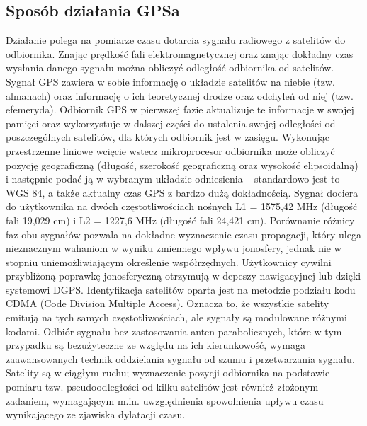 \documentclass{article}
\begin{document}
\subsection{Sposób działania GPSa}
Działanie polega na pomiarze czasu dotarcia sygnału radiowego z satelitów do odbiornika. Znając prędkość fali elektromagnetycznej oraz znając dokładny czas wysłania danego sygnału można obliczyć odległość odbiornika od satelitów. Sygnał GPS zawiera w sobie informację o układzie satelitów na niebie (tzw. almanach) oraz informację o ich teoretycznej drodze oraz odchyleń od niej (tzw. efemeryda). Odbiornik GPS w pierwszej fazie aktualizuje te informacje w swojej pamięci oraz wykorzystuje w dalszej części do ustalenia swojej odległości od poszczególnych satelitów, dla których odbiornik jest w zasięgu. Wykonując przestrzenne liniowe wcięcie wstecz mikroprocesor odbiornika może obliczyć pozycję geograficzną (długość, szerokość geograficzną oraz wysokość elipsoidalną) i następnie podać ją w wybranym układzie odniesienia – standardowo jest to WGS 84, a także aktualny czas GPS z bardzo dużą dokładnością.
Sygnał dociera do użytkownika na dwóch częstotliwościach nośnych L1 = 1575,42 MHz (długość fali 19,029 cm) i L2 = 1227,6 MHz (długość fali 24,421 cm). Porównanie różnicy faz obu sygnałów pozwala na dokładne wyznaczenie czasu propagacji, który ulega nieznacznym wahaniom w wyniku zmiennego wpływu jonosfery, jednak nie w stopniu uniemożliwiającym określenie współrzędnych. Użytkownicy cywilni przybliżoną poprawkę jonosferyczną otrzymują w depeszy nawigacyjnej lub dzięki systemowi DGPS.
Identyfikacja satelitów oparta jest na metodzie podziału kodu CDMA (Code Division Multiple Access). Oznacza to, że wszystkie satelity emitują na tych samych częstotliwościach, ale sygnały są modulowane różnymi kodami.
Odbiór sygnału bez zastosowania anten parabolicznych, które w tym przypadku są bezużyteczne ze względu na ich kierunkowość, wymaga zaawansowanych technik oddzielania sygnału od szumu i przetwarzania sygnału. Satelity są w ciągłym ruchu; wyznaczenie pozycji odbiornika na podstawie pomiaru tzw. pseudoodległości od kilku satelitów jest również złożonym zadaniem, wymagającym m.in. uwzględnienia spowolnienia upływu czasu wynikającego ze zjawiska dylatacji czasu.
\end{document}

